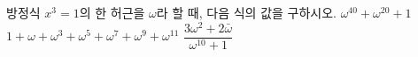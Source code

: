 방정식 $x^3=1$의 한 허근을 $\omega$라 할 때, 다음 식의 값을 구하시오. 
 $\omega^{40}+\omega^{20}+1$
 $1+\omega+\omega^3+\omega^5+\omega^7+\omega^9+\omega^{11}$
 $\dfrac{3\omega^2+2\bar{\omega}}{\omega^{10}+1}$
